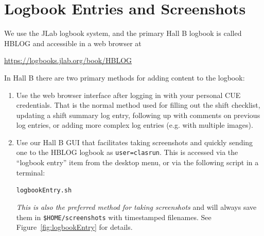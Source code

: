 \documentclass[amsmath,amssymb,notitlepage,11pt]{revtex4}
\begin{document}
\section{Logbook Entries and Screenshots}
We use the JLab logbook system, and the primary Hall B logbook is called HBLOG and accessible in a web browser at
\begin{center}\url{https://logbooks.jlab.org/book/HBLOG}\end{center}
In Hall B there are two primary methods for adding content to the logbook:
\begin{enumerate}
\item Use the web browser interface after logging in with your personal CUE credentials.  That is the normal method used for filling out the shift checklist, updating a shift summary log entry, following up with comments on previous log entries, or adding more complex log entries (e.g. with multiple images).
\item Use our Hall B GUI that facilitates taking screenshots and quickly sending one to the HBLOG logbook as \texttt{user=clasrun}.  This is accessed via the ``logbook entry'' item from the desktop menu, or via the following script in a terminal:
\begin{center}\texttt{logbookEntry.sh}\end{center}
    {\em This is also the preferred method for taking screenshots} and will always save them in \texttt{\$HOME/screenshots} with timestamped filenames.  See Figure~\ref{fig:logbookEntry} for details.
\end{enumerate}
\end{document}
